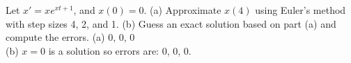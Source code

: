 {Let $x' = x e^{xt+1}$, and $x(0)=0$.
(a) Approximate $x(4)$ using Euler's method with step sizes 4, 2, and 1.
(b) Guess an exact solution based on part (a) and compute the errors.}
{(a) 0, 0, 0\\
(b) $x=0$ is a solution so errors are: 0, 0, 0.}